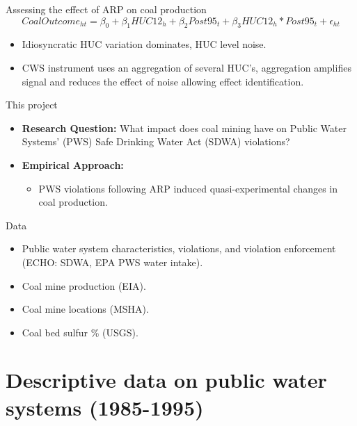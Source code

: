 \documentclass{beamer}
\begin{document}
\begin{frame}{{Assessing the effect of ARP on coal production}}
\begin{equation}
CoalOutcome_{ht}=\beta_0+\beta_1HUC12_h+\beta_2Post95_t + \beta_3HUC12_h*Post95_t+\epsilon_{ht}
\end{equation}
    

\begin{itemize}
    \item Idiosyncratic HUC variation dominates, HUC level noise.
    \item CWS instrument uses an aggregation of several HUC's, aggregation amplifies signal and reduces the effect of noise allowing effect identification.
\end{itemize}
\end{frame}

\begin{frame}{This project}
    \begin{itemize}
    \item \textbf{Research Question:} What impact does coal mining have on Public Water Systems' (PWS) Safe Drinking Water Act (SDWA) violations?
    \item \textbf{Empirical Approach:}
    \begin{itemize}
    \item PWS violations following ARP induced quasi-experimental changes in coal production.
    \end{itemize}
    \end{itemize}
\end{frame}

\begin{frame}{Data}
    \begin{itemize}
        \item Public water system characteristics, violations, and violation enforcement (ECHO: SDWA, EPA PWS water intake).
        \item Coal mine production (EIA).
        \item Coal mine locations (MSHA).
        \item Coal bed sulfur \% (USGS).
    \end{itemize}
\end{frame}



\section{Descriptive data on public water systems (1985-1995)}
\end{document}
